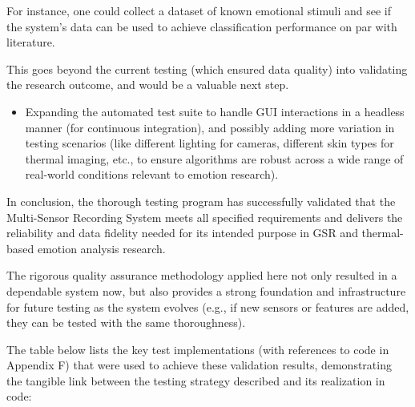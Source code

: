 {{{{{{{{{{{{{{{{For instance, one could collect a dataset of known emotional stimuli and see if the system's data can be used to achieve classification performance on par with literature.

This goes beyond the current testing (which ensured data quality) into validating the research outcome, and would be a valuable next step.

\begin{itemize}
 
\item Expanding the automated test suite to handle GUI interactions in a headless manner (for continuous integration), and possibly adding more variation in testing scenarios (like different lighting for cameras, different skin types for thermal imaging, etc., to ensure algorithms are robust across a wide range of real-world conditions relevant to emotion research).

\end{itemize}

In conclusion, the thorough testing program has successfully validated that the Multi-Sensor Recording System meets all specified requirements and delivers the reliability and data fidelity needed for its intended purpose in GSR and thermal-based emotion analysis research.

The rigorous quality assurance methodology applied here not only resulted in a dependable system now, but also provides a strong foundation and infrastructure for future testing as the system evolves (e.g., if new sensors or features are added, they can be tested with the same thoroughness).

The table below lists the key test implementations (with references to code in Appendix F) that were used to achieve these validation results, demonstrating the tangible link between the testing strategy described and its realization in code: \begin{itemize}
 

\end{itemize}}}}}}}}}}}}}}}}}
